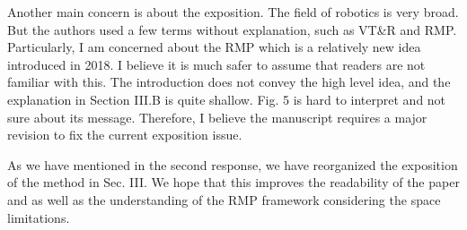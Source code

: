 \documentclass[a4paper,11pt]{article}
\begin{document}
\begin{displayquote}
	Another main concern is about the exposition. The field of robotics is
	very broad. But the authors used a few terms without explanation, such
	as VT\&R and RMP. Particularly, I am concerned about the RMP which is a
	relatively new idea introduced in 2018. I believe it is much safer to
	assume that readers are not familiar with this. The introduction does
	not convey the high level idea, and the explanation in Section III.B is
	quite shallow. Fig. 5 is hard to interpret and not sure about its
	message. Therefore, I believe the manuscript requires a major revision
	to fix the current exposition issue.
\end{displayquote}

As we have mentioned in the second response, we have reorganized the exposition 
of the method in Sec. III. We hope that this improves the readability of the 
paper and as well as the understanding of the RMP framework considering the 
space limitations.

% 
% 

\pagebreak


\end{document}
